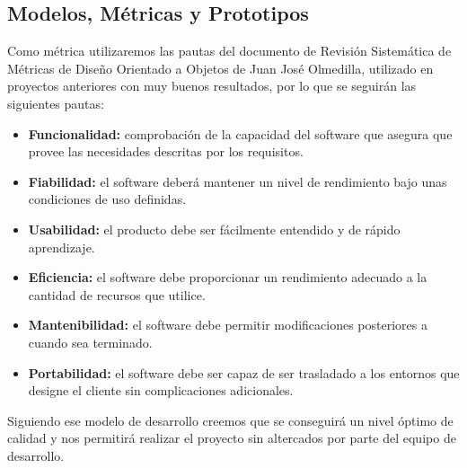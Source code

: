 \subsection{Modelos, Métricas y Prototipos}
\par Como métrica utilizaremos las pautas del documento de Revisión Sistemática de Métricas de Diseño Orientado a Objetos de Juan José Olmedilla, utilizado en proyectos anteriores con muy buenos resultados, por lo que se seguirán las siguientes pautas:
\begin{itemize}
	\item \textbf{Funcionalidad:} comprobación de la capacidad del software que asegura que provee las necesidades descritas por los requisitos.
	\item \textbf{Fiabilidad:} el software deberá mantener un nivel de rendimiento bajo unas condiciones de uso definidas.
	\item \textbf{Usabilidad:} el producto debe ser fácilmente entendido y de rápido aprendizaje.
	\item \textbf{Eficiencia:} el software debe proporcionar un rendimiento adecuado a la cantidad de recursos que utilice.
	\item \textbf{Mantenibilidad:} el software debe permitir modificaciones posteriores a cuando sea terminado.
	\item \textbf{Portabilidad:} el software debe ser capaz de ser trasladado a los entornos que designe el cliente sin complicaciones adicionales.
\end{itemize}

\par Siguiendo ese modelo de desarrollo creemos que se conseguirá un nivel óptimo de calidad y nos permitirá realizar el proyecto sin altercados por parte del equipo de desarrollo.
